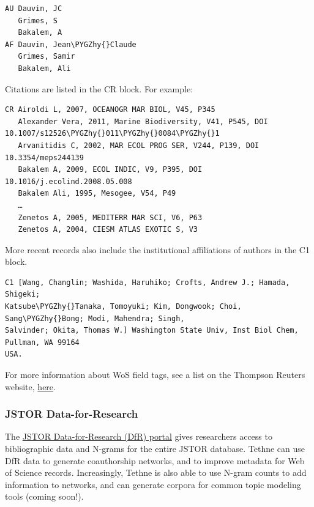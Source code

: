 \documentclass[letterpaper,10pt,english]{sphinxmanual}
\def\PYGZhy{\char`\-}
\begin{document}
\begin{Verbatim}[commandchars=\\\{\}]
AU Dauvin, JC
   Grimes, S
   Bakalem, A
AF Dauvin, Jean\PYGZhy{}Claude
   Grimes, Samir
   Bakalem, Ali
\end{Verbatim}

Citations are listed in the CR block. For example:

\begin{Verbatim}[commandchars=\\\{\}]
CR Airoldi L, 2007, OCEANOGR MAR BIOL, V45, P345
   Alexander Vera, 2011, Marine Biodiversity, V41, P545, DOI 10.1007/s12526\PYGZhy{}011\PYGZhy{}0084\PYGZhy{}1
   Arvanitidis C, 2002, MAR ECOL PROG SER, V244, P139, DOI 10.3354/meps244139
   Bakalem A, 2009, ECOL INDIC, V9, P395, DOI 10.1016/j.ecolind.2008.05.008
   Bakalem Ali, 1995, Mesogee, V54, P49
   …
   Zenetos A, 2005, MEDITERR MAR SCI, V6, P63
   Zenetos A, 2004, CIESM ATLAS EXOTIC S, V3
\end{Verbatim}

More recent records also include the institutional affiliations of authors in the C1
block.

\begin{Verbatim}[commandchars=\\\{\}]
C1 [Wang, Changlin; Washida, Haruhiko; Crofts, Andrew J.; Hamada, Shigeki;
Katsube\PYGZhy{}Tanaka, Tomoyuki; Kim, Dongwook; Choi, Sang\PYGZhy{}Bong; Modi, Mahendra; Singh,
Salvinder; Okita, Thomas W.] Washington State Univ, Inst Biol Chem, Pullman, WA 99164
USA.
\end{Verbatim}

For more information about WoS field tags, see a list on the Thompson Reuters website,
\href{http://images.webofknowledge.com/WOKRS53B4/help/WOS/hs\_wos\_fieldtags.html}{here}.


\subsubsection{JSTOR Data-for-Research}
\label{tutorial.getting_data:jstor-data-for-research}\label{tutorial.getting_data:getting-jstor}
The \href{http://dfr.jstor.org/?\&helpview=about\_dfr}{JSTOR Data-for-Research (DfR) portal}
gives researchers access to bibliographic data and N-grams for the entire JSTOR database.
Tethne can use DfR data to generate coauthorship networks, and to improve metadata for Web
of Science records. Increasingly, Tethne is also able to use N-gram counts to add
information to networks, and can generate corpora for common topic modeling tools (coming
soon!).
\end{document}
